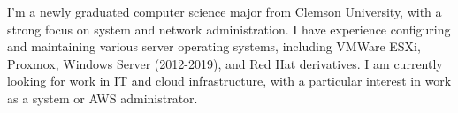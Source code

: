 

\begin{cvparagraph}

I'm a newly graduated computer science major from Clemson University, with a strong focus on system and network administration.  I have experience configuring and maintaining various server operating systems, including VMWare ESXi, Proxmox, Windows Server (2012-2019), and Red Hat derivatives.  I am currently looking for work in IT and cloud infrastructure, with a particular interest in work as a system or AWS administrator.
\end{cvparagraph}
